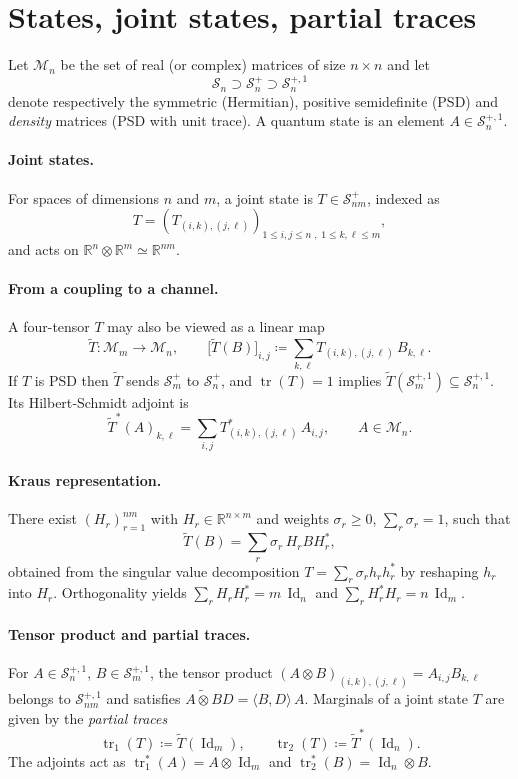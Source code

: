 \documentclass[10pt]{article}
\newcommand{\RR}{\mathbb{R}}
\newcommand{\Ss}{\mathcal{S}}
\newcommand{\Mm}{\mathcal{M}}
\newcommand{\Id}{\operatorname{Id}}
\newcommand{\tr}{\operatorname{tr}}
\newcommand{\To}{\widetilde{T}}
\providecommand{\dotp}[2]{\langle #1, #2\rangle}
\theoremstyle{plain}
\theoremstyle{definition}
\theoremstyle{remark}
\begin{document}
\section{States, joint states, partial traces}\label{sec:states}

Let $\Mm_n$ be the set of real (or complex) matrices of size $n\times n$ and let
\[
\Ss_n \supset \Ss_n^{+} \supset \Ss_n^{+,1}
\]
denote respectively the symmetric (Hermitian), positive semidefinite (PSD) and \emph{density} matrices (PSD with unit trace).  
A quantum state is an element $A\in\Ss_n^{+,1}$.

\paragraph{Joint states.}
For spaces of dimensions $n$ and $m$, a joint state is $T\in\Ss_{nm}^{+}$, indexed as
\[
T=(T_{(i,k),(j,\ell)})_{1\le i,j\le n\; , \; 1\le k,\ell\le m},
\]
and acts on $\RR^{n}\otimes\RR^{m}\simeq\RR^{nm}$.

\paragraph{From a coupling to a channel.}
A four-tensor $T$ may also be viewed as a linear map
\[
\To:\Mm_m \longrightarrow \Mm_n,\qquad 
\bigl[\To(B)\bigr]_{i,j} \coloneqq \sum_{k,\ell}T_{(i,k),(j,\ell)}\,B_{k,\ell}.
\]
If $T$ is PSD then $\To$ sends $\Ss_m^{+}$ to $\Ss_n^{+}$, and $\tr(T)=1$ implies $\To(\Ss_m^{+,1})\subseteq\Ss_n^{+,1}$.  
Its Hilbert‐Schmidt adjoint is
\[
\To^{*}(A)_{k,\ell} = \sum_{i,j}T_{(i,k),(j,\ell)}^{*}\,A_{i,j},\qquad A\in\Mm_n.
\]

\paragraph{Kraus representation.}
There exist $(H_r)_{r=1}^{nm}$ with $H_r\in\RR^{n\times m}$ and weights $\sigma_r\ge 0$, $\sum_r\sigma_r=1$, such that
\[
\To(B)=\sum_{r}\sigma_r\,H_rBH_r^{*},
\]
obtained from the singular value decomposition $T=\sum_{r}\sigma_r h_rh_r^{*}$ by reshaping $h_r$ into $H_r$.  
Orthogonality yields $\sum_r H_rH_r^{*}=m\,\Id_n$ and $\sum_r H_r^{*}H_r=n\,\Id_m$.

\paragraph{Tensor product and partial traces.}
For $A\in\Ss_n^{+,1}$, $B\in\Ss_m^{+,1}$, the tensor product $(A\otimes B)_{(i,k),(j,\ell)}=A_{i,j}B_{k,\ell}$ belongs to $\Ss_{nm}^{+,1}$ and satisfies $\widetilde{A\otimes B}D=\dotp{B}{D}\,A$.  
Marginals of a joint state $T$ are given by the \emph{partial traces}
\[
\tr_1(T)\coloneqq\To(\Id_m),\qquad
\tr_2(T)\coloneqq\To^{*}(\Id_n).
\]
The adjoints act as $\tr_1^{*}(A)=A\otimes\Id_m$ and $\tr_2^{*}(B)=\Id_n\otimes B$.
\end{document}
